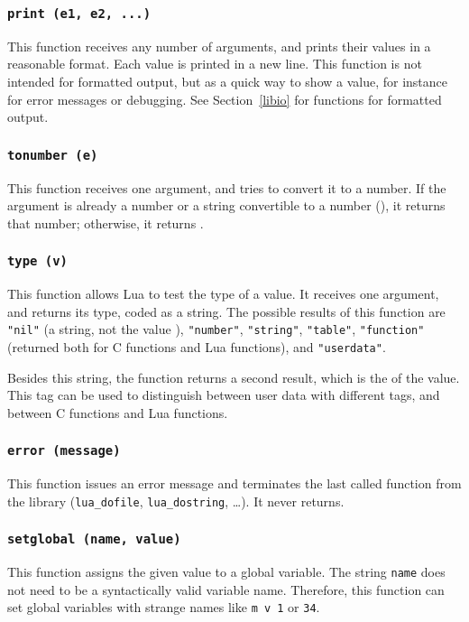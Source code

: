 \subsubsection*{{\tt print (e1, e2, ...)}}
This function receives any number of arguments,
and prints their values in a reasonable format.
Each value is printed in a new line.
This function is not intended for formatted output,
but as a quick way to show a value,
for instance for error messages or debugging.
See Section~\ref{libio} for functions for formatted output.

\subsubsection*{{\tt tonumber (e)}}
This function receives one argument,
and tries to convert it to a number.
If the argument is already a number or a string convertible
to a number (), it returns that number;
otherwise, it returns \nil.

\subsubsection*{{\tt type (v)}}
This function allows Lua to test the type of a value.
It receives one argument, and returns its type, coded as a string.
The possible results of this function are
\verb'"nil"' (a string, not the value \nil),
\verb'"number"',
\verb'"string"',
\verb'"table"',
\verb'"function"' (returned both for C functions and Lua functions),
and \verb'"userdata"'.

Besides this string, the function returns a second result,
which is the  of the value.
This tag can be used to distinguish between user
data with different tags,
and between C functions and Lua functions.

\subsubsection*{{\tt error (message)}}
This function issues an error message and terminates
the last called function from the library
(\verb'lua_dofile', \verb'lua_dostring', \ldots).
It never returns.

\subsubsection*{{\tt setglobal (name, value)}}
This function assigns the given value to a global variable.
The string \verb'name' does not need to be a syntactically valid variable name.
Therefore, this function can set global variables with strange names like
\verb'm v 1' or \verb'34'.

